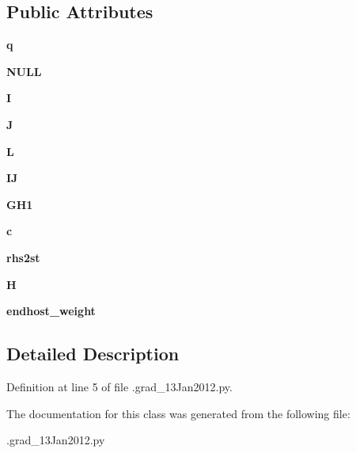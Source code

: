 \subsection*{Public Attributes}
\begin{DoxyCompactItemize}
\item 
\hypertarget{class_1_1Netcal_a7aca1efa3d94a4f556b2f935e109dca4}{
{\bfseries q}}
\label{class_1_1Netcal_a7aca1efa3d94a4f556b2f935e109dca4}

\item 
\hypertarget{class_1_1Netcal_a07cf3967e9326e9abfd45a03a3bd41fd}{
{\bfseries NULL}}
\label{class_1_1Netcal_a07cf3967e9326e9abfd45a03a3bd41fd}

\item 
\hypertarget{class_1_1Netcal_a5f6efc430fb0a3806f5e2711bd1e8085}{
{\bfseries I}}
\label{class_1_1Netcal_a5f6efc430fb0a3806f5e2711bd1e8085}

\item 
\hypertarget{class_1_1Netcal_ae39481ae2eeaba009cd842e6a184f15d}{
{\bfseries J}}
\label{class_1_1Netcal_ae39481ae2eeaba009cd842e6a184f15d}

\item 
\hypertarget{class_1_1Netcal_ad9fddc03907f09358424b3c4eb39fa75}{
{\bfseries L}}
\label{class_1_1Netcal_ad9fddc03907f09358424b3c4eb39fa75}

\item 
\hypertarget{class_1_1Netcal_a9ef50b4606f0032e0f23fc96211dfdf0}{
{\bfseries IJ}}
\label{class_1_1Netcal_a9ef50b4606f0032e0f23fc96211dfdf0}

\item 
\hypertarget{class_1_1Netcal_a62926daef843dc816f2bc96fde143bf5}{
{\bfseries GH1}}
\label{class_1_1Netcal_a62926daef843dc816f2bc96fde143bf5}

\item 
\hypertarget{class_1_1Netcal_a69a56004748bfbda5e25597fcde51e78}{
{\bfseries c}}
\label{class_1_1Netcal_a69a56004748bfbda5e25597fcde51e78}

\item 
\hypertarget{class_1_1Netcal_aeb9a378c91fb9b0fea46e528ff973f96}{
{\bfseries rhs2st}}
\label{class_1_1Netcal_aeb9a378c91fb9b0fea46e528ff973f96}

\item 
\hypertarget{class_1_1Netcal_afa8fc069fa5dff27bdf942eef54d2342}{
{\bfseries H}}
\label{class_1_1Netcal_afa8fc069fa5dff27bdf942eef54d2342}

\item 
\hypertarget{class_1_1Netcal_a972e8432966ad37be46c6dc452820b94}{
{\bfseries endhost\_\-weight}}
\label{class_1_1Netcal_a972e8432966ad37be46c6dc452820b94}

\end{DoxyCompactItemize}


\subsection{Detailed Description}


Definition at line 5 of file .grad\_\-13Jan2012.py.



The documentation for this class was generated from the following file:\begin{DoxyCompactItemize}
\item 
.grad\_\-13Jan2012.py\end{DoxyCompactItemize}
